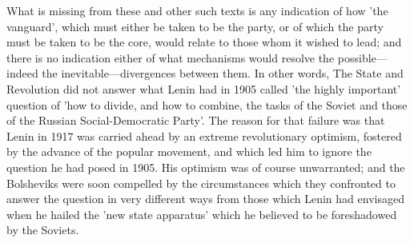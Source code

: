 What is missing from these and other such texts is any indication of how 'the vanguard', which must either be taken to be the party, or of which the party must be taken to be the core, would relate to those whom it wished to lead; and there is no indication either of what mechanisms would resolve the possible—indeed the inevitable—divergences between them. In other words, The State and Revolution did not answer what Lenin had in 1905 called 'the highly important' question of 'how to divide, and how to combine, the tasks of the Soviet and those of the Russian Social-Democratic Party'. The reason for that failure was that Lenin in 1917 was carried ahead by an extreme revolutionary optimism, fostered by the advance of the popular movement, and which led him to ignore the question he had posed in 1905. His optimism was of course unwarranted; and the Bolsheviks were soon compelled by the circumstances which they confronted to answer the question in very different ways from those which Lenin had envisaged when he hailed the 'new state apparatus' which he believed to be foreshadowed by the Soviets.

